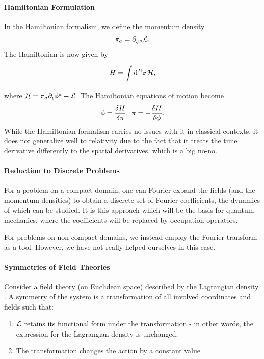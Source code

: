 
\paragraph{Hamiltonian Formulation}
In the Hamiltonian formalism, we define the momentum density
\begin{align*}
	\pi_{a} = \partial^{}_{\phi^{a}}\mathcal{L}.
\end{align*}
The Hamiltonian is now given by
\begin{align*}
	H = \int\limits_{}^{}\dd[D]{\vb{r}}\mathcal{H},
\end{align*}
where $\mathcal{H} = \pi_{a}\partial^{}_{t}\phi^{a} - \mathcal{L}$. The Hamiltonian equations of motion become
\begin{align*}
	\dot{\phi} = \fdv{H}{\pi},\ \dot{\pi} = -\fdv{H}{\phi}.
\end{align*}
While the Hamiltonian formalism carries no issues with it in classical contexts, it does not generalize well to relativity due to the fact that it treats the time derivative differently to the spatial derivatives, which is a big no-no.


\paragraph{Reduction to Discrete Problems}
For a problem on a compact domain, one can Fourier expand the fields (and the momentum densities) to obtain a discrete set of Fourier coefficients, the dynamics of which can be studied. It is this approach which will be the basis for quantum mechanics, where the coefficients will be replaced by occupation operators.

For problems on non-compact domains, we instead employ the Fourier transform as a tool. However, we have not really helped ourselves in this case.

\paragraph{Symmetries of Field Theories}
Consider a field theory (on Euclidean space) described by the Lagrangian density \lag. A symmetry of the system is a transformation of all involved coordinates and fields such that:
\begin{enumerate}
	\item $\mathcal{L}$ retains its functional form under the transformation - in other words, the expression for the Lagrangian density is unchanged.
	\item The transformation changes the action by a constant value
\end{enumerate}

